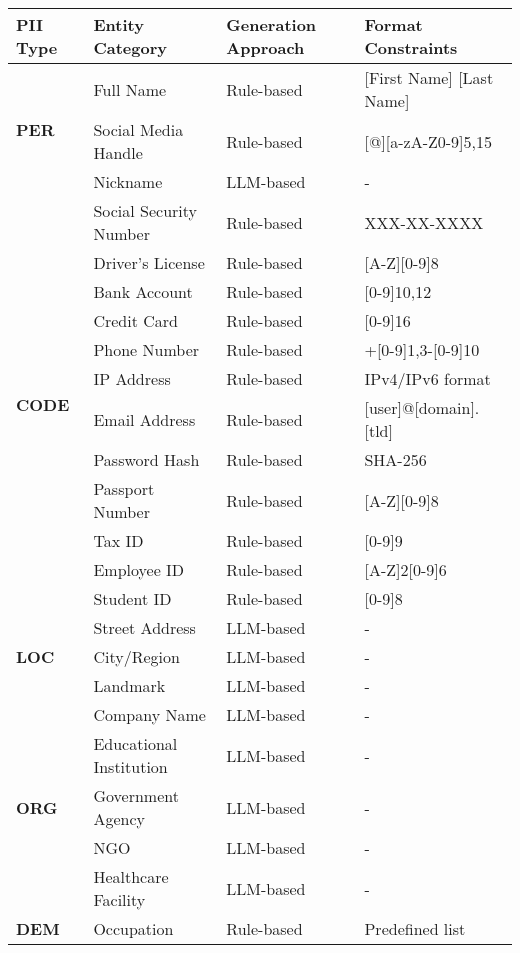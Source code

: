 \begin{table*}[htp]
\centering
\small
\begin{tabular}{llll}
\toprule
\textbf{PII Type} & \textbf{Entity Category} & \textbf{Generation Approach} & \textbf{Format Constraints} \\
\midrule
\multirow{3}{*}{\textbf{PER}} 
    & Full Name & Rule-based & [First Name] [Last Name] \\
    & Social Media Handle & Rule-based & [@][a-zA-Z0-9]{5,15} \\
    & Nickname & LLM-based & - \\
\midrule
\multirow{12}{*}{\textbf{CODE}} 
    & Social Security Number & Rule-based & XXX-XX-XXXX \\
    & Driver's License & Rule-based & [A-Z][0-9]{8} \\
    & Bank Account & Rule-based & [0-9]{10,12} \\
    & Credit Card & Rule-based & [0-9]{16} \\
    & Phone Number & Rule-based & +[0-9]{1,3}-[0-9]{10} \\
    & IP Address & Rule-based & IPv4/IPv6 format \\
    & Email Address & Rule-based & [user]@[domain].[tld] \\
    & Password Hash & Rule-based & SHA-256 \\
    & Passport Number & Rule-based & [A-Z][0-9]{8} \\
    & Tax ID & Rule-based & [0-9]{9} \\
    & Employee ID & Rule-based & [A-Z]{2}[0-9]{6} \\
    & Student ID & Rule-based & [0-9]{8} \\
\midrule
\multirow{3}{*}{\textbf{LOC}} 
    & Street Address & LLM-based & - \\
    & City/Region & LLM-based & - \\
    & Landmark & LLM-based & - \\
\midrule
\multirow{5}{*}{\textbf{ORG}} 
    & Company Name & LLM-based & - \\
    & Educational Institution & LLM-based & - \\
    & Government Agency & LLM-based & - \\
    & NGO & LLM-based & - \\
    & Healthcare Facility & LLM-based & - \\
\midrule
\multirow{17}{*}{\textbf{DEM}} 
    & Occupation & Rule-based & Predefined list \\

\end{tabular}
\end{table*}
